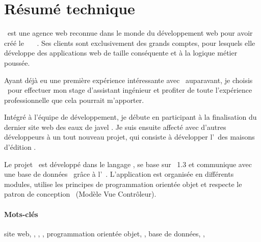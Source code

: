 \section*{Résumé technique}

\asl\ est une agence web reconnue dans le monde du développement web pour avoir créé le \afm\ \aphp\ \aos\ \asf. Ses clients sont exclusivement des grands comptes, pour lesquels elle développe des applications web de taille conséquente et à la logique métier poussée.

Ayant déjà eu une première expérience intéressante avec \asf\ auparavant, je choisis \asl\ pour effectuer mon stage d'assistant ingénieur et profiter de toute l'expérience professionnelle que cela pourrait m'apporter.

Intégré à l'équipe de développement, je débute en participant à la finalisation du dernier site web des eaux de javel \alc. Je suis ensuite affecté avec d'autres développeurs à un tout nouveau projet, qui consiste à développer l'\aintranet\ des maisons d'édition \aey.

Le projet \aey\ est développé dans le langage \aphp, se base sur \asf~1.3 et communique avec une base de données \apsql\ grâce à l'\aorm\ \adoctrine. L'application est organisée en différents modules, utilise les principes de programmation orientée objet et respecte le patron de conception \amvc\ (Modèle Vue Contrôleur).

\paragraph{Mots-clés}

site web, \aphp, \afm, \asf, programmation orientée objet, \amvc, base de données, \aorm, \adoctrine